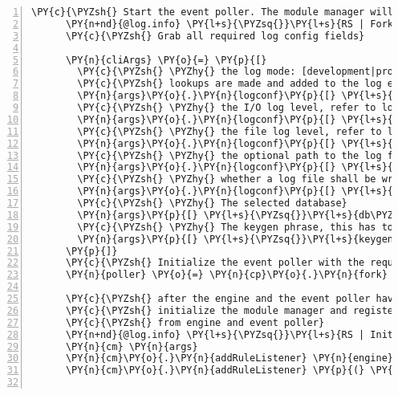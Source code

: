 \begin{Verbatim}[fontsize=\scriptsize,commandchars=\\\{\},numbers=left,firstnumber=1,stepnumber=1]
      \PY{c}{\PYZsh{} Start the event poller. The module manager will emit events for it}
      \PY{n+nd}{@log.info} \PY{l+s}{\PYZsq{}}\PY{l+s}{RS | Forking a child process for the event poller}\PY{l+s}{\PYZsq{}}
      \PY{c}{\PYZsh{} Grab all required log config fields}
      
      \PY{n}{cliArgs} \PY{o}{=} \PY{p}{[}
        \PY{c}{\PYZsh{} \PYZhy{} the log mode: [development|productive], in development expensive origin}
        \PY{c}{\PYZsh{} lookups are made and added to the log entries}
        \PY{n}{args}\PY{o}{.}\PY{n}{logconf}\PY{p}{[} \PY{l+s}{\PYZsq{}}\PY{l+s}{mode}\PY{l+s}{\PYZsq{}} \PY{p}{]}
        \PY{c}{\PYZsh{} \PYZhy{} the I/O log level, refer to logging.coffee for the different levels}
        \PY{n}{args}\PY{o}{.}\PY{n}{logconf}\PY{p}{[} \PY{l+s}{\PYZsq{}}\PY{l+s}{io\PYZhy{}level}\PY{l+s}{\PYZsq{}} \PY{p}{]}
        \PY{c}{\PYZsh{} \PYZhy{} the file log level, refer to logging.coffee for the different levels}
        \PY{n}{args}\PY{o}{.}\PY{n}{logconf}\PY{p}{[} \PY{l+s}{\PYZsq{}}\PY{l+s}{file\PYZhy{}level}\PY{l+s}{\PYZsq{}} \PY{p}{]}
        \PY{c}{\PYZsh{} \PYZhy{} the optional path to the log file}
        \PY{n}{args}\PY{o}{.}\PY{n}{logconf}\PY{p}{[} \PY{l+s}{\PYZsq{}}\PY{l+s}{file\PYZhy{}path}\PY{l+s}{\PYZsq{}} \PY{p}{]}
        \PY{c}{\PYZsh{} \PYZhy{} whether a log file shall be written at all [true|false]}
        \PY{n}{args}\PY{o}{.}\PY{n}{logconf}\PY{p}{[} \PY{l+s}{\PYZsq{}}\PY{l+s}{nolog}\PY{l+s}{\PYZsq{}} \PY{p}{]}
        \PY{c}{\PYZsh{} \PYZhy{} The selected database}
        \PY{n}{args}\PY{p}{[} \PY{l+s}{\PYZsq{}}\PY{l+s}{db\PYZhy{}select}\PY{l+s}{\PYZsq{}} \PY{p}{]}
        \PY{c}{\PYZsh{} \PYZhy{} The keygen phrase, this has to be handled differently in the future!}
        \PY{n}{args}\PY{p}{[} \PY{l+s}{\PYZsq{}}\PY{l+s}{keygen}\PY{l+s}{\PYZsq{}} \PY{p}{]}
      \PY{p}{]}
      \PY{c}{\PYZsh{} Initialize the event poller with the required CLI arguments}
      \PY{n}{poller} \PY{o}{=} \PY{n}{cp}\PY{o}{.}\PY{n}{fork} \PY{n}{path}\PY{o}{.}\PY{n}{resolve}\PY{p}{(} \PY{n}{\PYZus{}\PYZus{}dirname}\PY{p}{,} \PY{n}{nameEP} \PY{p}{)}\PY{p}{,} \PY{n}{cliArgs}

      \PY{c}{\PYZsh{} after the engine and the event poller have been initialized we can}
      \PY{c}{\PYZsh{} initialize the module manager and register event listener functions}
      \PY{c}{\PYZsh{} from engine and event poller}
      \PY{n+nd}{@log.info} \PY{l+s}{\PYZsq{}}\PY{l+s}{RS | Initialzing module manager}\PY{l+s}{\PYZsq{}}
      \PY{n}{cm} \PY{n}{args}
      \PY{n}{cm}\PY{o}{.}\PY{n}{addRuleListener} \PY{n}{engine}\PY{o}{.}\PY{n}{internalEvent}
      \PY{n}{cm}\PY{o}{.}\PY{n}{addRuleListener} \PY{p}{(} \PY{n}{evt} \PY{p}{)} \PY{o}{\PYZhy{}}\PY{o}{\PYZgt{}} \PY{n}{poller}\PY{o}{.}\PY{n}{send} \PY{n}{evt}


\end{Verbatim}

